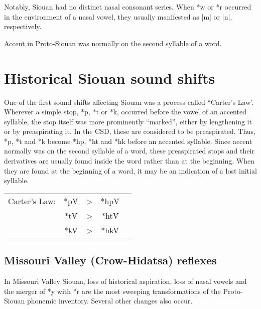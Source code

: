 \documentclass[output=paper]{LSP/langsci}
\begin{document}
Notably, Siouan had no distinct nasal consonant series.  When *w or *r occurred in the environment of a nasal vowel, they usually manifested as |m| or |n|, respectively.

Accent in Proto-Siouan was normally on the second syllable of a word.

\section{Historical Siouan sound shifts}

One of the first sound shifts affecting Siouan was a process called ``Carter's Law'.  Wherever a simple stop, *p, *t or *k, occurred before the vowel of an accented syllable, the stop itself was more prominently ``marked'', either by lengthening it or by preaspirating it.  In the CSD, these are considered to be preaspirated.  Thus, *p, *t and *k become *hp, *ht and *hk before an accented syllable.  Since accent normally was on the second syllable of a word, these preaspirated stops and their derivatives are usually found inside the word rather than at the beginning.  When they are found at the beginning of a word, it may be an indication of a lost initial syllable.


\begin{tabular}[t]{c c c c c }

Carter's Law: & *p\'V & > & *hp\'V  \\

& *t\'V & >  & *ht\'V \\

&  *k\'V & >  & *hk\'V\\
\end{tabular}

\subsection{Missouri Valley (Crow-Hidatsa) reflexes}

In Missouri Valley Siouan, loss of historical aspiration, loss of nasal vowels and the merger of *y with *r are the most sweeping transformations of the Proto-Siouan phonemic inventory.  Several other changes also occur.
\end{document}
